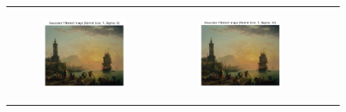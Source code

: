 \documentclass[hidelinks,12pt]{article}
\begin{document}
\begin{figure}[!h]
{\begin{tabular}{cccc}
\begin{subfigure}[h]{0.25\textwidth}
					\includegraphics[width=\textwidth]{figures/gaussian_filter/7.png}
				\end{subfigure} &
				\begin{subfigure}[h]{0.25\textwidth}
					\centering
					\includegraphics[width=\textwidth]{figures/gaussian_filter/8.png}
				\end{subfigure} \\
				

\end{tabular}}
\end{figure}
\end{document}
